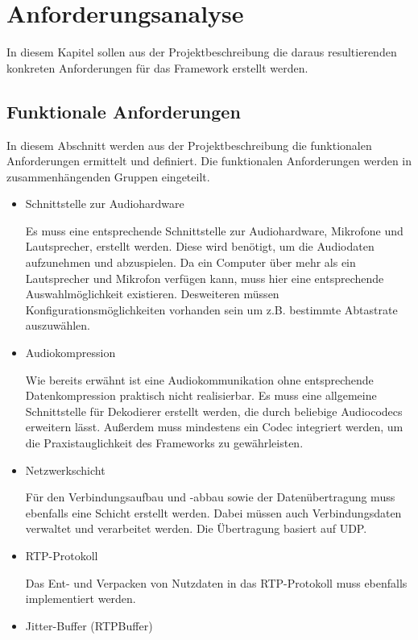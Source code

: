 \chapter{Anforderungsanalyse}
In diesem Kapitel sollen aus der Projektbeschreibung die daraus resultierenden konkreten Anforderungen für das Framework erstellt werden. 

\section{Funktionale Anforderungen}
	In diesem Abschnitt werden aus der Projektbeschreibung die funktionalen Anforderungen ermittelt und definiert. Die funktionalen Anforderungen werden in zusammenhängenden Gruppen eingeteilt.

	\begin{itemize} 
		\item Schnittstelle zur Audiohardware

		Es muss eine entsprechende Schnittstelle zur Audiohardware, Mikrofone und Lautsprecher, erstellt werden. Diese wird benötigt, um die Audiodaten aufzunehmen und abzuspielen. Da ein Computer über mehr als ein Lautsprecher und Mikrofon verfügen kann, muss hier eine entsprechende Auswahlmöglichkeit existieren. Desweiteren müssen Konfigurationsmöglichkeiten vorhanden sein um z.B. bestimmte Abtastrate auszuwählen.
			
		\item Audiokompression

		Wie bereits erwähnt ist eine Audiokommunikation ohne entsprechende Datenkompression praktisch nicht realisierbar. Es muss eine allgemeine Schnittstelle für Dekodierer erstellt werden, die durch beliebige Audiocodecs erweitern lässt. Außerdem muss mindestens ein Codec integriert werden, um die Praxistauglichkeit des Frameworks zu gewährleisten.
			
		\item Netzwerkschicht

		Für den Verbindungsaufbau und -abbau sowie der Datenübertragung muss ebenfalls eine Schicht erstellt werden. Dabei müssen auch Verbindungsdaten verwaltet und verarbeitet werden. Die Übertragung basiert auf UDP.
				
		\item RTP-Protokoll

		Das Ent- und Verpacken von Nutzdaten in das RTP-Protokoll muss ebenfalls implementiert werden.
				
		\item Jitter-Buffer (RTPBuffer)


\end{itemize}
